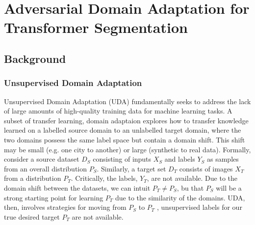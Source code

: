 \documentclass[a4paper,12pt]{report}
\begin{document}
\chapter{Adversarial Domain Adaptation for Transformer Segmentation}

\section{Background}


\subsection{Unsupervised Domain Adaptation}
Unsupervised Domain Adaptation (UDA) fundamentally seeks to address the lack of large amounts of high-quality training data for machine learning tasks. A subset of transfer learning, domain adaptaion explores how to transfer knowledge learned on a labelled source domain to an unlabelled target domain, where the two domains possess the same label space but contain a domain shift. This shift may be small (e.g. one city to another) or large (synthetic to real data). Formally, consider a source dataset $D_S$ consisting of inputs $X_S$ and labels $Y_S$ as samples from an overall distribution $P_S$. Similarly, a target set $D_T$ consists of images $X_T$ from a distribution $P_T$. Critically, the labels, $Y_T$, are not available. Due to the domain shift between the datasets, we can intuit $P_T \neq P_S$, bu that  $P_S$ will be a strong starting point for learning $P_T$ due to the similarity of the domains. UDA, then, involves strategies for moving from $P_S$ to $P_T$ \cite{wilson_survey_2020}, unsupervised labels for our true desired target $P_T$ are not available.
\end{document}
